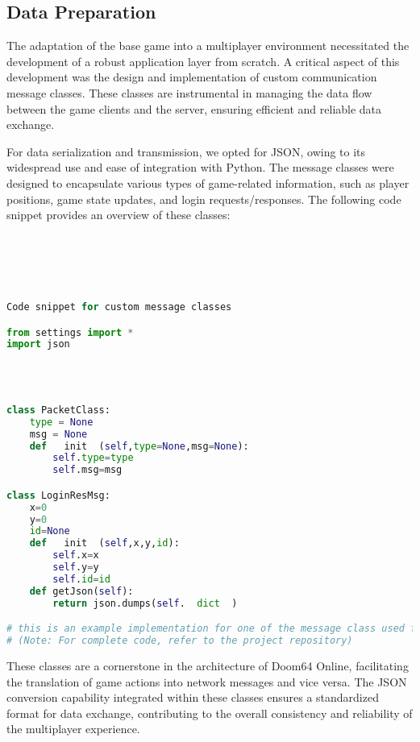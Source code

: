 \subsection{Data Preparation}
\label{sec:data preparation}

The adaptation of the base game into a multiplayer environment necessitated the development of a robust application layer from scratch. A critical aspect of this development was the design and implementation of custom communication message classes. These classes are instrumental in managing the data flow between the game clients and the server, ensuring efficient and reliable data exchange.

For data serialization and transmission, we opted for JSON, owing to its widespread use and ease of integration with Python. The message classes were designed to encapsulate various types of game-related information, such as player positions, game state updates, and login requests/responses. The following code snippet provides an overview of these classes:

\begin{lstlisting}[language=Python]





Code snippet for custom message classes

from settings import *
import json




class PacketClass:
    type = None
    msg = None
    def   init  (self,type=None,msg=None):
        self.type=type
        self.msg=msg

class LoginResMsg:
	x=0
	y=0
	id=None
	def   init  (self,x,y,id):
		self.x=x
		self.y=y
		self.id=id
	def getJson(self):
		return json.dumps(self.  dict  )

# this is an example implementation for one of the message class used for login
# (Note: For complete code, refer to the project repository)

\end{lstlisting}

These classes are a cornerstone in the architecture of Doom64 Online, facilitating the translation of game actions into network messages and vice versa. The JSON conversion capability integrated within these classes ensures a standardized format for data exchange, contributing to the overall consistency and reliability of the multiplayer experience.

